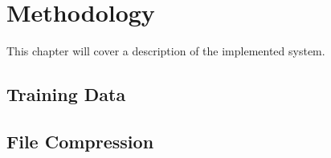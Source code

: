 \chapter{Methodology}
This chapter will cover a description of the implemented system. 

\section{Training Data}

\section{File Compression}

